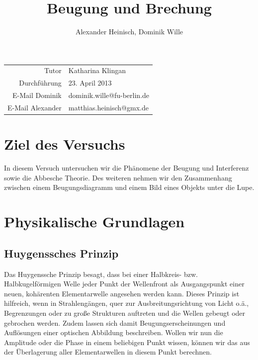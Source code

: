 \documentclass{article}
\title{Beugung und Brechung}
\author{Alexander Heinisch, Dominik Wille}
\begin{document}
\maketitle
\vspace{13cm}
\noindent
\begin{center}
\begin{tabular}{r l}
Tutor & Katharina Klingan  \\
Durchführung & 23. April 2013 \\

E-Mail Dominik & dominik.wille@fu-berlin.de \\
E-Mail Alexander & matthias.heinisch@gmx.de \\
\end{tabular}
\end{center}

\newpage
\tableofcontents
\newpage


\section{Ziel des Versuchs}
In diesem Versuch untersuchen wir die Phänomene der Beugung und Interferenz sowie die Abbesche Theorie. Des weiteren nehmen wir den Zusammenhang zwischen einem Beugungsdiagramm und einem Bild eines Objekts unter die Lupe.\\


\section{Physikalische Grundlagen}
\subsection{Huygenssches Prinzip}
Das Huygenssche Prinzip besagt, dass bei einer Halbkreis- bzw. Halbkugelförmigen Welle jeder Punkt der Wellenfront als Ausgangspunkt einer neuen, kohärenten Elementarwelle angesehen werden kann. Dieses Prinzip ist hilfreich, wenn in Strahlengängen, quer zur Ausbreitungsrichtung von Licht o.ä., Begrenzungen oder zu große Strukturen auftreten und die Wellen gebeugt oder gebrochen werden. Zudem lassen sich damit Beugungserscheinungen und Auflösungen einer optischen Abbildung beschreiben.
Wollen wir nun die Amplitude oder die Phase in einem beliebigen Punkt wissen,  können wir das aus der Überlagerung aller Elementarwellen in diesem Punkt berechnen. \\
\end{document}
